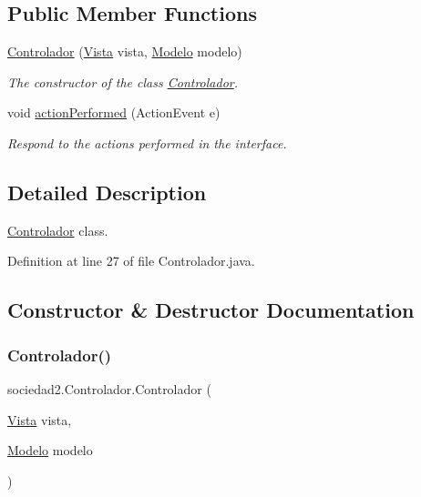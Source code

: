 \subsection*{Public Member Functions}
\begin{DoxyCompactItemize}
\item 
\mbox{\hyperlink{classsociedad2_1_1_controlador_a7601ad3194e4adbe6f760df3ed36c607}{Controlador}} (\mbox{\hyperlink{classsociedad2_1_1_vista}{Vista}} vista, \mbox{\hyperlink{classsociedad2_1_1_modelo}{Modelo}} modelo)
\begin{DoxyCompactList}\small\item\em The constructor of the class \mbox{\hyperlink{classsociedad2_1_1_controlador}{Controlador}}. \end{DoxyCompactList}\item 
void \mbox{\hyperlink{classsociedad2_1_1_controlador_a87860be9c7aff3e6d88d4e88f66e6f51}{action\+Performed}} (Action\+Event e)
\begin{DoxyCompactList}\small\item\em Respond to the actions performed in the interface. \end{DoxyCompactList}\end{DoxyCompactItemize}


\subsection{Detailed Description}
\mbox{\hyperlink{classsociedad2_1_1_controlador}{Controlador}} class. 

Definition at line 27 of file Controlador.\+java.



\subsection{Constructor \& Destructor Documentation}
\mbox{\label{classsociedad2_1_1_controlador_a7601ad3194e4adbe6f760df3ed36c607}} 
\subsubsection{\texorpdfstring{Controlador()}{Controlador()}}
{\footnotesize\ttfamily sociedad2.\+Controlador.\+Controlador (\begin{DoxyParamCaption}\item[{\mbox{\hyperlink{classsociedad2_1_1_vista}{Vista}}}]{vista,  }\item[{\mbox{\hyperlink{classsociedad2_1_1_modelo}{Modelo}}}]{modelo }\end{DoxyParamCaption})}




